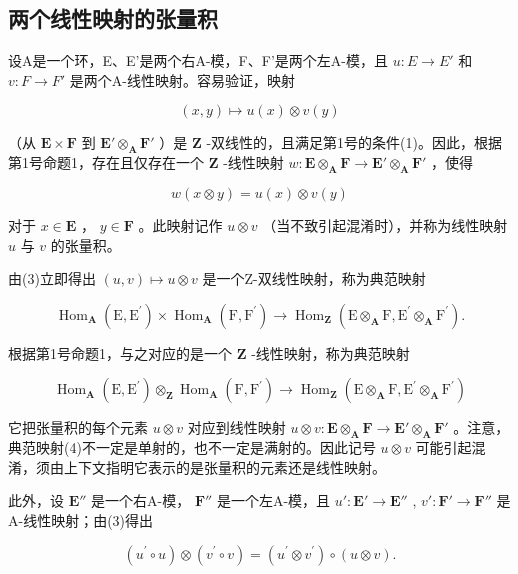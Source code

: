 \subsection{两个线性映射的张量积}

设A是一个环，E、E'是两个右A-模，F、F'是两个左A-模，且 \(u: E \rightarrow E'\) 和 \(v: F \rightarrow F'\) 是两个A-线性映射。容易验证，映射

\[
(x, y) \mapsto u (x) \otimes v (y)
\]

（从 \(\mathbf{E} \times \mathbf{F}\) 到 \(\mathbf{E}' \otimes_{\mathbf{A}} \mathbf{F}'\) ）是 \(\mathbf{Z}\) -双线性的，且满足第1号的条件(1)。因此，根据第1号命题1，存在且仅存在一个 \(\mathbf{Z}\) -线性映射 \(w: \mathbf{E} \otimes_{\mathbf{A}} \mathbf{F} \to \mathbf{E}' \otimes_{\mathbf{A}} \mathbf{F}'\) ，使得

\[
w (x \otimes y) = u (x) \otimes v (y)\tag{3}
\]

对于 \(x \in \mathbf{E}\) ， \(y \in \mathbf{F}\) 。此映射记作 \(u \otimes v\) （当不致引起混淆时），并称为线性映射 \(u\) 与 \(v\) 的张量积。

由(3)立即得出 \((u, v) \mapsto u \otimes v\) 是一个Z-双线性映射，称为典范映射

\[
\operatorname{Hom} _ {\mathbf {A}} (\mathrm{E}, \mathrm{E} ^ {\prime}) \times \operatorname{Hom} _ {\mathbf {A}} (\mathrm{F}, \mathrm{F} ^ {\prime}) \rightarrow \operatorname{Hom} _ {\mathbf {Z}} (\mathrm{E} \otimes_ {\mathbf {A}} \mathrm{F}, \mathrm{E} ^ {\prime} \otimes_ {\mathbf {A}} \mathrm{F} ^ {\prime}).
\]

根据第1号命题1，与之对应的是一个 \(\mathbf{Z}\) -线性映射，称为典范映射

\[
\operatorname{Hom} _ {\mathbf {A}} (\mathrm{E}, \mathrm{E} ^ {\prime}) \otimes_ {\mathbf {Z}} \operatorname{Hom} _ {\mathbf {A}} (\mathrm{F}, \mathrm{F} ^ {\prime}) \rightarrow \operatorname{Hom} _ {\mathbf {Z}} (\mathrm{E} \otimes_ {\mathbf {A}} \mathrm{F}, \mathrm{E} ^ {\prime} \otimes_ {\mathbf {A}} \mathrm{F} ^ {\prime})\tag{4}
\]

它把张量积的每个元素 \(u \otimes v\) 对应到线性映射 \(u \otimes v: \mathbf{E} \otimes_{\mathbf{A}} \mathbf{F} \to \mathbf{E}' \otimes_{\mathbf{A}} \mathbf{F}'\) 。注意，典范映射(4)不一定是单射的，也不一定是满射的。因此记号 \(u \otimes v\) 可能引起混淆，须由上下文指明它表示的是张量积的元素还是线性映射。

此外，设 \(\mathbf{E}''\) 是一个右A-模， \(\mathbf{F}''\) 是一个左A-模，且 \(u':\mathbf{E}'\to\mathbf{E}''\) , \(v':\mathbf{F}'\to\mathbf{F}''\) 是A-线性映射；由(3)得出

\[
\left(u ^ {\prime} \circ u\right) \otimes \left(v ^ {\prime} \circ v\right) = \left(u ^ {\prime} \otimes v ^ {\prime}\right) \circ (u \otimes v).\tag{5}
\]
